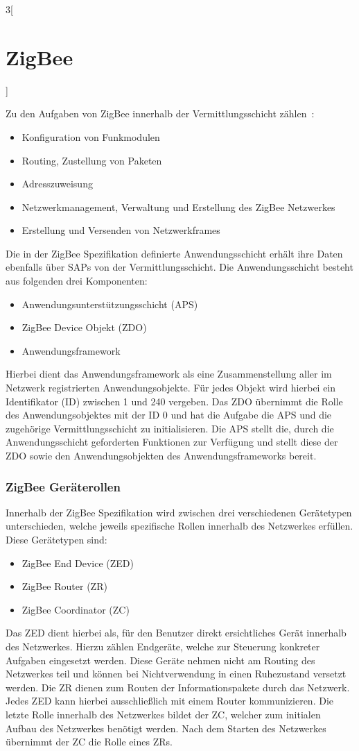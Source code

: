 \begin{multicols}{3}[\section{ZigBee}]
\par Zu den Aufgaben von ZigBee innerhalb der Vermittlungsschicht zählen~\cite{zigbee.1}: 
\begin{itemize}
	\item Konfiguration von Funkmodulen
	\item Routing, Zustellung von Paketen
	\item Adresszuweisung
	\item Netzwerkmanagement, Verwaltung und Erstellung des ZigBee Netzwerkes
	\item Erstellung und Versenden von Netzwerkframes
\end{itemize}
Die in der ZigBee Spezifikation definierte Anwendungsschicht erhält ihre Daten ebenfalls über SAPs von der Vermittlungsschicht. Die Anwendungsschicht besteht aus folgenden drei Komponenten: 
\begin{itemize}
	\item Anwendungsunterstützungsschicht (APS)
	\item ZigBee Device Objekt (ZDO)
	\item Anwendungsframework
\end{itemize}
Hierbei dient das Anwendungsframework als eine Zusammenstellung aller im Netzwerk registrierten Anwendungsobjekte. Für jedes Objekt wird hierbei ein Identifikator (ID) zwischen 1 und 240 vergeben. Das ZDO übernimmt die Rolle des Anwendungsobjektes mit der ID 0 und hat die Aufgabe die APS und die zugehörige Vermittlungsschicht zu initialisieren. Die APS stellt die, durch die Anwendungsschicht geforderten Funktionen zur Verfügung und stellt diese der ZDO sowie den Anwendungsobjekten des Anwendungsframeworks bereit.~\cite{zigbee.1}
\subsubsection*{ZigBee Geräterollen}
Innerhalb der ZigBee Spezifikation wird zwischen drei verschiedenen Gerätetypen unterschieden, welche jeweils spezifische Rollen innerhalb des Netzwerkes erfüllen. Diese Gerätetypen sind: 
\begin{itemize}
	\item ZigBee End Device (ZED)
	\item ZigBee Router (ZR)
	\item ZigBee Coordinator (ZC)
\end{itemize}
Das ZED dient hierbei als, für den Benutzer direkt ersichtliches Gerät innerhalb des Netzwerkes. Hierzu zählen Endgeräte, welche zur Steuerung konkreter Aufgaben eingesetzt werden. Diese Geräte nehmen nicht am Routing des Netzwerkes teil und können bei Nichtverwendung in einen Ruhezustand versetzt werden. Die ZR dienen zum Routen der Informationspakete durch das Netzwerk. Jedes ZED kann hierbei ausschließlich mit einem Router kommunizieren. Die letzte Rolle innerhalb des Netzwerkes bildet der ZC, welcher zum initialen Aufbau des Netzwerkes benötigt werden. Nach dem Starten des Netzwerkes übernimmt der ZC die Rolle eines ZRs.~\cite{zigbee.10}


\end{multicols}

